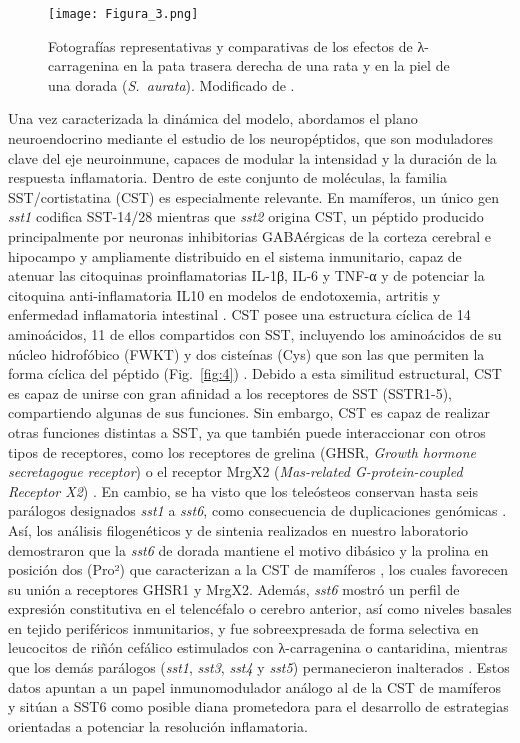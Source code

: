 \documentclass[10pt,a4paper]{article}
\begin{document}
\begin{figure}[ht]
  \centering
   \texttt{[image: Figura\_3.png]}
 
  \caption{Fotografías representativas y comparativas de los efectos de λ-carragenina en la pata trasera derecha de una rata y en la piel de una dorada (\textit{S.\ aurata}). Modificado de  \parencite{CamposSanchez2021a, Hussein2012}.}
  \label{fig:3}
\end{figure}

Una vez caracterizada la dinámica del modelo, abordamos el plano neuroendocrino mediante el estudio de los neuropéptidos, que son moduladores clave del eje neuroinmune, capaces de modular la intensidad y la duración de la respuesta inflamatoria. Dentro de este conjunto de moléculas, la familia SST/cortistatina (CST) es especialmente relevante. En mamíferos, un único gen \textit{sst1} codifica SST-14/28 mientras que \textit{sst2} origina CST, un péptido producido principalmente por neuronas inhibitorias GABAérgicas de la corteza cerebral e hipocampo y ampliamente distribuido en el sistema inmunitario, capaz de atenuar las citoquinas proinflamatorias IL-1β, IL-6 y TNF-α y de potenciar la citoquina anti-inflamatoria IL10 en modelos de endotoxemia, artritis y enfermedad inflamatoria intestinal  \parencite{GonzalezRey2008,DeLecea1996}. CST posee una estructura cíclica de 14 aminoácidos, 11 de ellos compartidos con SST, incluyendo los aminoácidos de su núcleo hidrofóbico (FWKT) y dos cisteínas (Cys) que son las que permiten la forma cíclica del péptido (Fig.~\ref{fig:4}) \parencite{DeLecea1996}. Debido a esta similitud estructural, CST es capaz de unirse con gran afinidad a los receptores de SST (SSTR1-5), compartiendo algunas de sus funciones. Sin embargo, CST es capaz de realizar otras funciones distintas a SST, ya que también puede interaccionar con otros tipos de receptores, como los receptores de grelina (GHSR, \textit{Growth hormone secretagogue receptor}) o el receptor MrgX2 (\textit{Mas-related G-protein-coupled Receptor X2}) \parencite{Robas2003}. En cambio, se ha visto que los teleósteos conservan hasta seis parálogos designados \textit{sst1} a \textit{sst6}, como consecuencia de duplicaciones genómicas \parencite{Very2002}. Así, los análisis filogenéticos y de sintenia realizados en nuestro laboratorio demostraron que la \textit{sst6} de dorada mantiene el motivo dibásico y la prolina en posición dos (Pro²) que caracterizan a la CST de mamíferos \parencite{CamposSanchez2025b}, los cuales favorecen su unión a receptores GHSR1 y MrgX2. Además, \textit{sst6} mostró un perfil de expresión constitutiva en el telencéfalo o cerebro anterior, así como niveles basales en tejido periféricos inmunitarios, y fue sobreexpresada de forma selectiva en leucocitos de riñón cefálico estimulados con λ-carragenina o cantaridina, mientras que los demás parálogos (\textit{sst1}, \textit{sst3}, \textit{sst4} y \textit{sst5}) permanecieron inalterados \parencite{CamposSanchez2025b}. Estos datos apuntan a un papel inmunomodulador análogo al de la CST de mamíferos y sitúan a SST6 como posible diana prometedora para el desarrollo de estrategias orientadas a potenciar la resolución inflamatoria.
\end{document}
